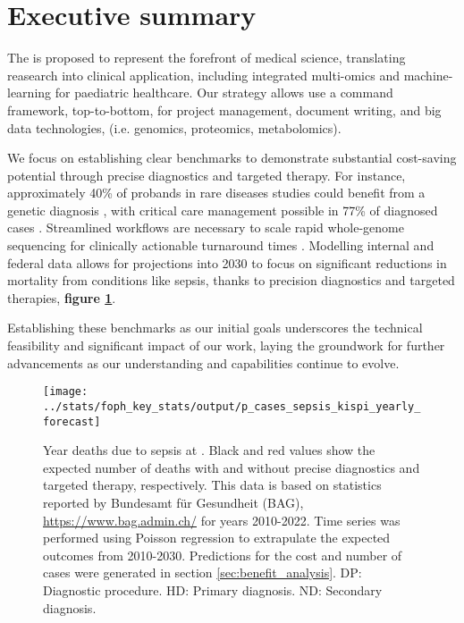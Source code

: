 \section{Executive summary}

The \pmu is proposed to represent the forefront of medical science, translating reasearch into clinical application, including integrated multi-omics and machine-learning for paediatric healthcare. 
Our strategy allows use a command framework, top-to-bottom, for project management, document writing, and big data technologies, (i.e. genomics, proteomics, metabolomics). 

We focus on establishing clear benchmarks to demonstrate substantial cost-saving potential through precise diagnostics and targeted therapy. For instance, approximately 40\% of probands in rare diseases studies could benefit from a genetic diagnosis
\citep{wright2023genomic, wojcik2024genome}, 
with critical care management possible in 77\% of diagnosed cases
\citep{lunke2023integrated}. 
Streamlined workflows are necessary to scale rapid whole-genome sequencing for clinically actionable turnaround times \citep{abou2023rapid}. 
Modelling internal and federal data allows for projections into 2030 to focus on significant reductions in mortality from conditions like sepsis, thanks to precision diagnostics and targeted therapies, \textbf{figure
\ref{fig:p_cases_sepsis_kispi_yearly_forecast_exec}}.

Establishing these benchmarks as our initial goals underscores the technical feasibility and significant impact of our work, laying the groundwork for further advancements as our understanding and capabilities continue to evolve.

\begin{figure}[h] \hspace*{0cm} 
\begin{center}
	\texttt{[image: ../stats/foph\_key\_stats/output/p\_cases\_sepsis\_kispi\_yearly\_forecast]}
	\caption{Year deaths due to sepsis at \kispi. Black and red values show the expected number of deaths with and without  precise diagnostics and targeted therapy, respectively.
	This data is based on statistics reported by Bundesamt für Gesundheit (BAG), 
	\url{https://www.bag.admin.ch/} for years 2010-2022. 
	Time series was performed using Poisson regression to extrapulate the expected outcomes from 2010-2030.
	Predictions for the cost and number of cases were generated in section 
	\ref{sec:benefit_analysis}.	
	DP: Diagnostic procedure.
HD: Primary diagnosis.
ND: Secondary diagnosis.
}
	\label{fig:p_cases_sepsis_kispi_yearly_forecast_exec}
\end{center}
\end{figure}
